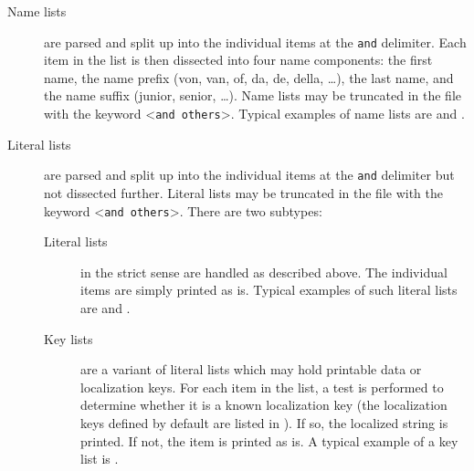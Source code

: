 \documentclass{ltxdockit}[2011/03/25]
\begin{document}
\begin{description}

\item[Name lists] are parsed and split up into the individual items at the \texttt{and} delimiter. Each item in the list is then dissected into four name components: the first name, the name prefix (von, van, of, da, de, della, \dots), the last name, and the name suffix (junior, senior, \dots). Name lists may be truncated in the  file with the keyword <\texttt{and others}>. Typical examples of name lists are  and .

\item[Literal lists] are parsed and split up into the individual items at the \texttt{and} delimiter but not dissected further. Literal lists may be truncated in the  file with the keyword <\texttt{and others}>. There are two subtypes:

\begin{description}

\item[Literal lists] in the strict sense are handled as described above. The individual items are simply printed as is. Typical examples of such literal lists are  and .

\item[Key lists] are a variant of literal lists which may hold printable data or localization keys. For each item in the list, a test is performed to determine whether it is a known localization key (the localization keys defined by default are listed in ). If so, the localized string is printed. If not, the item is printed as is. A typical example of a key list is .

\end{description}
\end{description}
\end{document}
